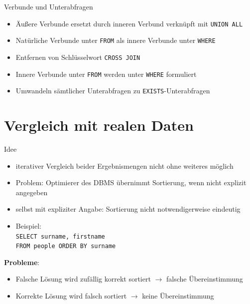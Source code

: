 \documentclass{beamer}
\begin{document}
\begin{frame}[fragile]{Verbunde und Unterabfragen}
\begin{itemize}
\item Äußere Verbunde ersetzt durch inneren Verbund verknüpft mit \verb|UNION ALL|
\item Natürliche Verbunde unter \verb|FROM| als innere Verbunde unter \verb|WHERE|
\item Entfernen von Schlüsselwort \verb|CROSS JOIN|
\item Innere Verbunde unter \verb|FROM| werden unter \verb|WHERE| formuliert
\item Umwandeln sämtlicher Unterabfragen zu \verb|EXISTS|-Unterabfragen 
\end{itemize}
\end{frame}

\section{Vergleich mit realen Daten}



\begin{frame}[fragile]{Idee}
\begin{itemize}
\item iterativer Vergleich beider Ergebnismengen nicht ohne weiteres möglich
\item Problem: Optimierer des DBMS übernimmt Sortierung, wenn nicht explizit angegeben
\item selbst mit expliziter Angabe: Sortierung nicht notwendigerweise eindeutig
\item Beispiel: \\\verb|SELECT surname, firstname|\\\verb|FROM people ORDER BY surname|
\end{itemize}
\textbf{Probleme}:\pause\\
\begin{itemize}
\item Falsche Lösung wird zufällig korrekt sortiert $\to$ falsche Übereinstimmung
\item Korrekte Lösung wird falsch sortiert $\to$ keine Übereinstimmung 
\end{itemize}
\end{frame}
\end{document}
